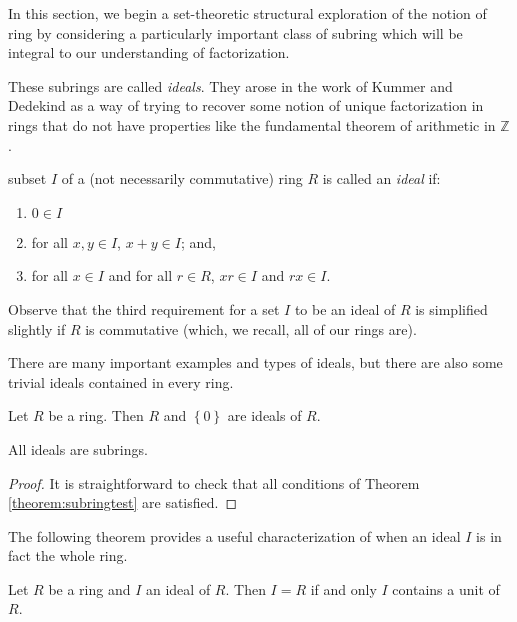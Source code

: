 \documentclass[english,course]{lecture}
\theoremstyle{plain}
\newenvironment{definition}[1]
  {\renewcommand\theinnerdefinition{#1}\innerdefinition}
  {\endinnerdefinition}
\def\set#1{\left\{ {#1} \right\}}
\def\Z{{\mathbb Z}}
\def\presnotes{}
\begin{document}
In this section, we begin a set-theoretic structural exploration of the notion of ring by considering a particularly important class of subring which will be integral to our understanding of factorization.

These subrings are called \emph{ideals}. They arose in the work of Kummer and Dedekind as a way of trying to recover some notion of unique factorization in rings that do not have properties like the fundamental theorem of arithmetic in $\Z$.



\begin{definition}
	A subset $I$ of a (not necessarily commutative) ring $R$ is called an \emph{ideal} if:
	\begin{enumerate}
	\item $0\in I$
	\item for all $x,y\in I$, $x+y\in I$; and,
	\item for all $x\in I$ and for all $r\in R$, $xr\in I$ and $rx\in I$.
\end{enumerate}
\end{definition}


Observe that the third requirement for a set $I$ to be an ideal of $R$ is simplified slightly if $R$ is commutative (which, we recall, all of our rings are).

There are many important examples and types of ideals, but there are also some trivial ideals contained in every ring.

\begin{theorem}
	Let $R$ be a ring.
	Then $R$ and $\set{0}$ are ideals of $R$.
\end{theorem}

\presnotes




\begin{theorem}
	All ideals are subrings.
\end{theorem}

\begin{proof}
	It is straightforward to check that all conditions of Theorem \ref{theorem:subringtest} are satisfied.
\end{proof}

\presnotes

The following theorem provides a useful characterization of when an ideal $I$ is in fact the whole ring.


\begin{theorem}
	Let $R$ be a ring and $I$ an ideal of $R$.
	Then $I = R$ if and only $I$ contains a unit of $R$.
\end{theorem}
\end{document}
